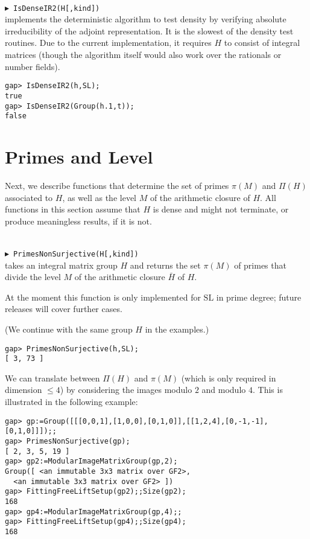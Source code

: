 \documentclass[a4paper,12pt]{amsart}
\newcommand{\SL}{\mathrm{SL}}
\def\mycmd#1{\ \smallskip\\$\blacktriangleright$\ #1\\}
\begin{document}
\mycmd{{\tt IsDenseIR2(H[,kind])}}
implements the deterministic algorithm \cite[p.23]{Rivin1} to test
density by verifying absolute irreducibility of the adjoint representation. It
is the slowest of the density test routines.
Due to the current implementation, it requires $H$ to consist of
integral matrices (though the algorithm itself would also work over the
rationals or number fields).
\begin{verbatim}
gap> IsDenseIR2(h,SL);
true
gap> IsDenseIR2(Group(h.1,t));
false
\end{verbatim}

\section{Primes and Level}

Next, we describe functions that determine the set of primes $\pi(M)$ and
$\Pi(H)$ associated to $H$, as well as the level $M$ of the arithmetic
closure of $H$. All functions in this section assume that $H$ is dense and
might not terminate, or produce meaningless results, if it is not.

\mycmd{{\tt PrimesNonSurjective(H[,kind])}}
takes an integral matrix group $H$ and
returns the set $\pi(M)$ of primes that divide the level $M$ of the arithmetic
closure $\bar H$ of $H$.

At the moment this function is only implemented for $\SL$ in prime degree;
future releases will cover further cases.

(We continue with the same group $H$ in the examples.)
\begin{verbatim}
gap> PrimesNonSurjective(h,SL);
[ 3, 73 ]
\end{verbatim}

We can translate between $\Pi(H)$ and $\pi(M)$ (which is only required in
dimension $\le 4$) by considering the images
modulo $2$ and modulo $4$. This is illustrated in the following example:

\begin{verbatim}
gap> gp:=Group([[[0,0,1],[1,0,0],[0,1,0]],[[1,2,4],[0,-1,-1],[0,1,0]]]);;
gap> PrimesNonSurjective(gp);
[ 2, 3, 5, 19 ]
gap> gp2:=ModularImageMatrixGroup(gp,2);
Group([ <an immutable 3x3 matrix over GF2>,
  <an immutable 3x3 matrix over GF2> ])
gap> FittingFreeLiftSetup(gp2);;Size(gp2);
168
gap> gp4:=ModularImageMatrixGroup(gp,4);;
gap> FittingFreeLiftSetup(gp4);;Size(gp4);
168
\end{verbatim}
\end{document}
